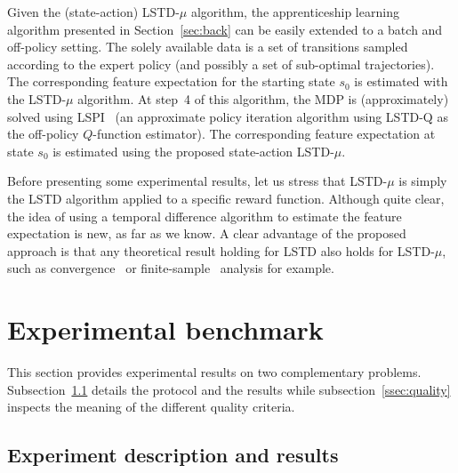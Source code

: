 \documentclass{jfpda2011}
\begin{document}
Given the (state-action) LSTD-$\mu$ algorithm, the apprenticeship
learning algorithm presented in Section~\ref{sec:back} can be easily extended to a batch and
off-policy setting. The solely available data is a set of
transitions sampled according to the expert policy  (and possibly a set of sub-optimal trajectories). The
corresponding feature expectation for the starting state $s_0$ is
estimated with the LSTD-$\mu$ algorithm. At step~4 of this
algorithm, the MDP is (approximately) solved using
LSPI~\citep{lagoudakis2003least} (an approximate policy iteration
algorithm using LSTD-Q as the off-policy $Q$-function estimator).
The corresponding feature expectation at state $s_0$ is estimated
using the proposed state-action LSTD-$\mu$.

Before presenting some experimental results, let us stress that
LSTD-$\mu$ is simply the LSTD algorithm applied to a specific reward
function. Although quite clear, the idea of using a temporal
difference algorithm to estimate the feature expectation is new, as
far as we know. A clear advantage of the proposed approach is that
any theoretical result holding for LSTD also holds for LSTD-$\mu$,
such as convergence~\citep{nedic2003least} or
finite-sample~\citep{lazaric2010finiteLSTD} analysis for example.
\section{Experimental benchmark}
\label{sec:exp}
This section provides experimental results on two complementary problems. Subsection~\ref{ssec:exp} details the protocol and the results while subsection~\ref{ssec:quality} inspects the meaning of the different quality criteria. 
\subsection{Experiment description and results}
\label{ssec:exp}
\end{document}
